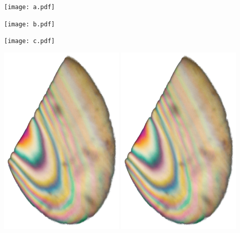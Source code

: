 

\hypersetup{
	pdftitle=
}

\title{}
\author{
	Martin Ueding \\
	\small{\href{mailto:mu@martin-ueding.de}{mu@martin-ueding.de}}
}

\pagestyle{empty}



\texttt{[image: a.pdf]}

\texttt{[image: b.pdf]}

\texttt{[image: c.pdf]}

\includegraphics[width=0.45\textwidth]{Spannungsoptik.jpg}
\includegraphics[width=0.45\textwidth]{Spannungsoptik.jpg}


%	
%	



